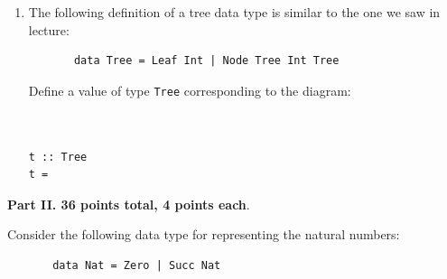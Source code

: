\documentclass[12pt]{article}
\begin{document}
\begin{enumerate}[resume]
\item The following definition of a tree data type is similar to the one we saw in lecture:
\begin{verbatim}
       data Tree = Leaf Int | Node Tree Int Tree
\end{verbatim}
Define a value of type \verb+Tree+ corresponding to the diagram:
\begin{center}
\begin{boxedminipage}{1.9in}
\end{boxedminipage}
\end{center}
\begin{verbatim}


t :: Tree
t = 
\end{verbatim}

\end{enumerate}

\pagebreak

\noindent
{\bf {\textsc Part II.} 36 points total, 4 points each}.

\noindent
Consider the following data type for representing the natural numbers:
\begin{verbatim}
       data Nat = Zero | Succ Nat
\end{verbatim}
\end{document}
